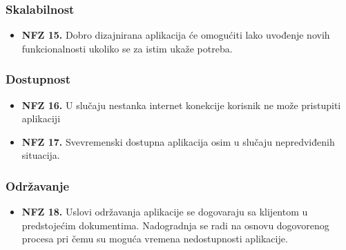 \subsubsection{Skalabilnost}
\begin{itemize}
    \item \textbf{NFZ 15.} Dobro dizajnirana aplikacija će omogućiti lako uvođenje novih funkcionalnosti ukoliko se za istim ukaže potreba. 
\end{itemize}
\subsubsection{Dostupnost}
\begin{itemize}
    \item \textbf{NFZ 16.} U slučaju nestanka internet konekcije korisnik ne može pristupiti aplikaciji
    \item \textbf{NFZ 17.} Svevremenski dostupna aplikacija osim u slučaju nepredviđenih situacija.
    \end{itemize}
\subsubsection{Održavanje}
\begin{itemize}
    \item \textbf{NFZ 18.} Uslovi održavanja aplikacije se dogovaraju sa klijentom u predstojećim dokumentima. Nadogradnja se radi na osnovu dogovorenog procesa pri čemu su moguća vremena nedostupnosti aplikacije.
\end{itemize}
